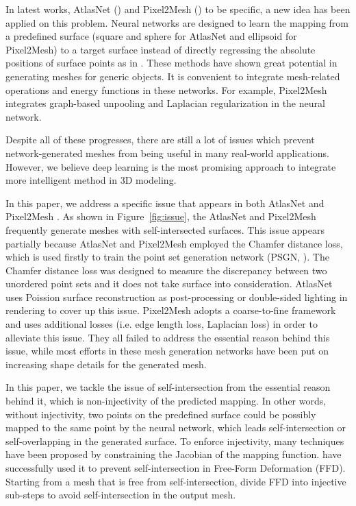 In latest works, AtlasNet (\cite{atlasnet}) and Pixel2Mesh (\cite{pixel2mesh}) to be specific, a new idea has been applied on this problem. Neural networks are designed to learn the mapping from a predefined surface (square and sphere for AtlasNet and ellipsoid for Pixel2Mesh) to a target surface instead of directly regressing the absolute positions of surface points as in \cite{PSGN}. These methods have shown great potential in generating meshes for generic objects. It is convenient to integrate mesh-related operations and energy functions in these networks. For example, Pixel2Mesh integrates graph-based unpooling and Laplacian regularization in the neural network.

Despite all of these progresses, there are still a lot of issues which prevent network-generated meshes from being useful in many real-world applications. However, we believe deep learning is the most promising approach to integrate more intelligent method in 3D modeling.

 In this paper, we address a specific issue that appears in both AtlasNet \cite{atlasnet} and Pixel2Mesh \cite{pixel2mesh}. As shown in Figure~\ref{fig:issue}, the AtlasNet and Pixel2Mesh frequently generate meshes with self-intersected surfaces. This issue appears partially because AtlasNet and Pixel2Mesh employed the Chamfer distance loss, which is used firstly to train the point set generation network (PSGN, \cite{PSGN}). The Chamfer distance loss was designed to measure the discrepancy between two unordered point sets and it does not take surface into consideration. AtlasNet uses Poission surface reconstruction as post-processing or double-sided lighting in rendering to cover up this issue. Pixel2Mesh adopts a coarse-to-fine framework and uses additional losses (i.e. edge length loss, Laplacian loss) in order to alleviate this issue. They all failed to address the essential reason behind this issue, while most efforts in these mesh generation networks have been put on increasing shape details for the generated mesh.

In this paper, we tackle the issue of self-intersection from the essential reason behind it, which is non-injectivity of the predicted mapping. In other words, without injectivity, two points on the predefined surface could be possibly mapped to the same point by the neural network, which leads self-intersection or self-overlapping in the generated surface.
To enforce injectivity, many techniques have been proposed by constraining the Jacobian of the mapping function. \cite{tvcgprevent} have successfully used it to prevent self-intersection in Free-Form Deformation (FFD). Starting from a mesh that is free from self-intersection, \cite{tvcgprevent} divide FFD into injective sub-steps to avoid self-intersection in the output mesh.

